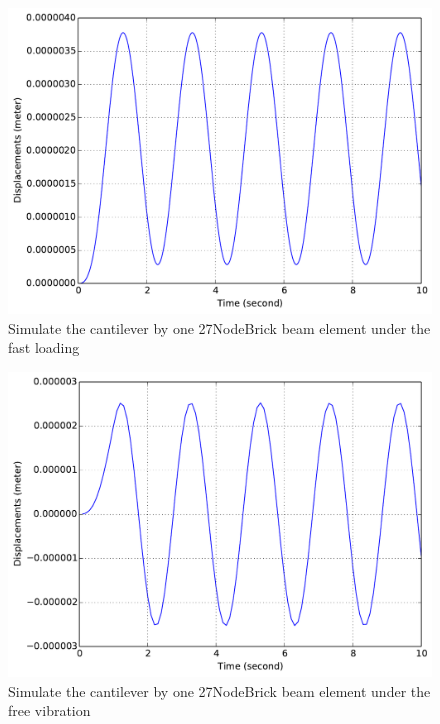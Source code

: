 \begin{figure}[!htb]
  \centering
  \includegraphics[width=12cm]{./Figure-files/_Chapter_Appendix_Illustrative_Examples/brick-mass-1element-fastLoading.pdf}
  \caption{Simulate the cantilever by one 27NodeBrick beam element under the fast loading}
  \label{fig_27brick-mass-fast}
\end{figure}

\begin{figure}[!htb]
  \centering
  \includegraphics[width=12cm]{./Figure-files/_Chapter_Appendix_Illustrative_Examples/brick-mass-1element-freeVibration.pdf}
  \caption{Simulate the cantilever by one 27NodeBrick beam element under the free vibration}
  \label{fig_27brick-mass-freeVib}
\end{figure}

























